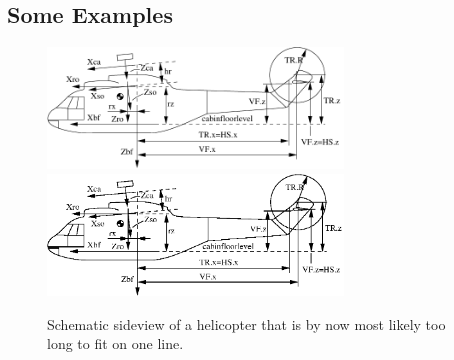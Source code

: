         \subsection{Some Examples}%
        \begin{figure}[!hbt]
            \centering
            \ifpdf
              \includegraphics[width=0.7\textwidth]{./figs/chap_introduction/heli_sideview_pdf}
            \else
              \includegraphics[width=0.7\textwidth]{./figs/chap_introduction/heli_sideview}
            \fi
            \caption[Short caption in the lof: schematic sideview of a helicopter]{Schematic sideview of a helicopter that is by now most likely too long to fit on one line.}
            \label{fig:sideview_reference_frames}
        \end{figure}
